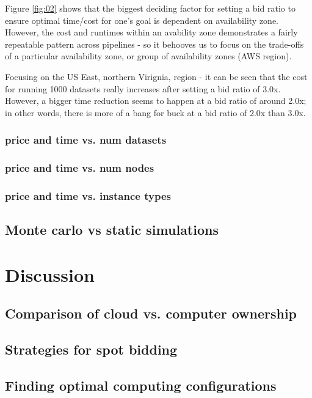 \documentclass{frontiersSCNS} %
\begin{document}
Figure \ref{fig:02} shows that the biggest deciding factor for setting a bid ratio to ensure optimal time/cost for one's goal is dependent on availability zone. However, the cost and runtimes within an avability zone demonstrates a fairly repeatable pattern across pipelines - so it behooves us to focus on the trade-offs of a particular availability zone, or group of availability zones (AWS region). 

Focusing on the US East, northern Virignia, region - it can be seen that the cost for running 1000 datasets really increases after setting a bid ratio of 3.0x. However, a bigger time reduction seems to happen at a bid ratio of around 2.0x; in other words, there is more of a bang for buck at a bid ratio of 2.0x than 3.0x.

\subsubsection{price and time vs. num datasets}
\subsubsection{price and time vs. num nodes}
\subsubsection{price and time vs. instance types}

\subsection{Monte carlo vs static simulations}



\section{Discussion}

\subsection{Comparison of cloud vs. computer ownership}

\subsection{Strategies for spot bidding}

\subsection{Finding optimal computing configurations}
\end{document}
